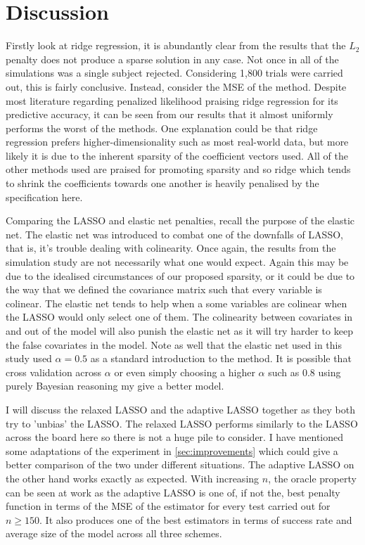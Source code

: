 \newpage
\part{Discussion}\label{Discussion}

Firstly look at ridge regression, it is abundantly clear from the results that the $L_2$ penalty does not produce a sparse solution in any case. Not once in all of the simulations was a single subject rejected. Considering 1,800 trials were carried out, this is fairly conclusive. Instead, consider the MSE of the method. Despite most literature regarding penalized likelihood praising ridge regression for its predictive accuracy, it can be seen from our results that it almost uniformly performs the worst of the methods. One explanation could be that ridge regression prefers higher-dimensionality such as most real-world data, but more likely it is due to the inherent sparsity of the coefficient vectors used. All of the other methods used are praised for promoting sparsity and so ridge which tends to shrink the coefficients towards one another is heavily penalised by the specification here. 

Comparing the LASSO and elastic net penalties, recall the purpose of the elastic net. The elastic net was introduced to combat one of the downfalls of LASSO, that is, it's trouble dealing with colinearity. Once again, the results from the simulation study are not necessarily what one would expect. Again this may be due to the idealised circumstances of our proposed sparsity, or it could be due to the way that we defined the covariance matrix such that every variable is colinear. The elastic net tends to help when a some variables are colinear when the LASSO would only select one of them. The colinearity between covariates in and out of the model will also punish the elastic net as it will try harder to keep the false covariates in the model. Note as well that the elastic net used in this study used $\alpha=0.5$ as a standard introduction to the method. It is possible that cross validation across $\alpha$ or even simply choosing a higher $\alpha$ such as 0.8 using purely Bayesian reasoning my give a better model.

I will discuss the relaxed LASSO and the adaptive LASSO together as they both try to 'unbias' the LASSO. The relaxed LASSO performs similarly to the LASSO across the board here so there is not a huge pile to consider. I have mentioned some adaptations of the experiment in \cref{sec:improvements} which could give a better comparison of the two under different situations. The adaptive LASSO on the other hand works exactly as expected. With increasing $n$, the oracle property can be seen at work as the adaptive LASSO is one of, if not the, best penalty function in terms of the MSE of the estimator for every test carried out for $n\geq150$. It also produces one of the best estimators in terms of success rate and average size of the model across all three schemes.

